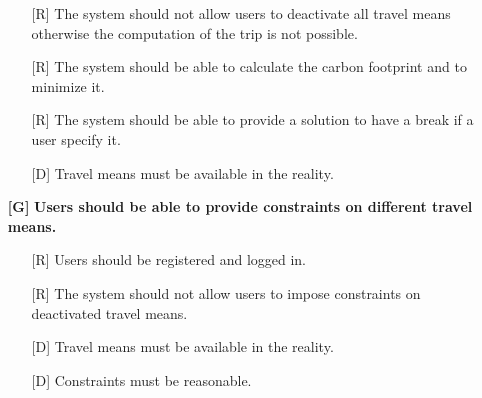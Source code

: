 \documentclass[12pt,titlepage]{article}
\begin{document}
\begin{itemize}
\begin{itemize}
\item[{[R\ped{5}]}]  The system should not allow users to deactivate all travel means otherwise the computation of the trip is not possible.
\item[{[R\ped{6}]}]  The system should be able to calculate the carbon footprint and to minimize it.
\item[{[R\ped{6}]}]  The system should be able to provide a solution to have a break if a user specify it.
\item[{[D\ped{1}]}] Travel means must be available in the reality.
\end{itemize}
\item[\textbf{ {[G\ped{7}]}	}]	\textbf{Users should be able to provide constraints on different travel means.}
\begin{itemize}
\item[{[R\ped{1}]}]  Users should be registered and logged in.
\item[{[R\ped{2}]}]  The system should not allow users to impose constraints on deactivated travel means.

\item[{[D\ped{1}]}] Travel means must be available in the reality.
\item[{[D\ped{2}]}] Constraints must be reasonable.
\end{itemize}


\end{itemize}
\end{document}
